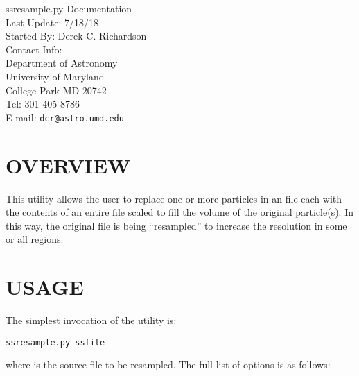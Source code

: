 



\begin{flushleft}
  \huge{ssresample.py Documentation}\\
  \bigskip\bigskip
  \Large{Last Update: 7/18/18}\\
  \bigskip\bigskip
  \large{Started By: Derek C. Richardson}\\
  \bigskip
  \large{Contact Info:}\\
  Department of Astronomy\\
  University of Maryland\\
  College Park MD 20742\\
  Tel: 301-405-8786\\
  E-mail: \texttt{dcr@astro.umd.edu}
\end{flushleft}

\tableofcontents

\section{OVERVIEW}

This utility allows the user to replace one or more particles in an
 file each with the contents of an entire  file
scaled to fill the volume of the original particle(s).  In this way,
the original file is being ``resampled'' to increase the resolution in
some or all regions.

\section{USAGE}

The simplest invocation of the utility is:
\begin{verbatim}
ssresample.py ssfile
\end{verbatim}
where  is the source file to be resampled.  The full list
of options is as follows:

